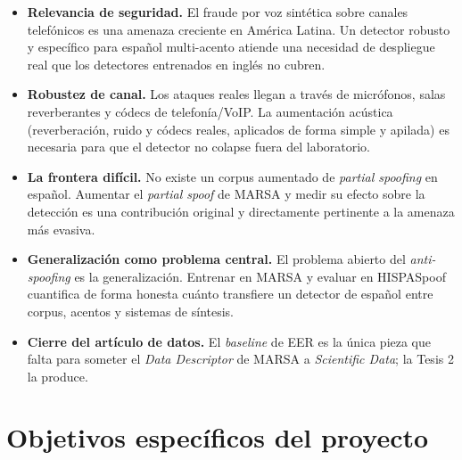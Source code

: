 \documentclass[11pt]{article}
\begin{document}
\begin{itemize}[leftmargin=1.2em]
  \item \textbf{Relevancia de seguridad.} El fraude por voz sint\'etica
  sobre canales telef\'onicos es una amenaza creciente en Am\'erica
  Latina. Un detector robusto y espec\'ifico para espa\~nol multi-acento
  atiende una necesidad de despliegue real que los detectores entrenados
  en ingl\'es no cubren.

  \item \textbf{Robustez de canal.} Los ataques reales llegan a trav\'es
  de micr\'ofonos, salas reverberantes y c\'odecs de telefon\'ia/VoIP. La
  aumentaci\'on ac\'ustica (reverberaci\'on, ruido y c\'odecs reales,
  aplicados de forma simple y apilada) es necesaria para que el detector
  no colapse fuera del laboratorio.

  \item \textbf{La frontera dif\'icil.} No existe un corpus aumentado de
  \emph{partial spoofing} en espa\~nol. Aumentar el \emph{partial spoof}
  de MARSA y medir su efecto sobre la detecci\'on es una contribuci\'on
  original y directamente pertinente a la amenaza m\'as evasiva.

  \item \textbf{Generalizaci\'on como problema central.} El problema
  abierto del \emph{anti-spoofing} es la generalizaci\'on. Entrenar en
  MARSA y evaluar en HISPASpoof cuantifica de forma honesta cu\'anto
  transfiere un detector de espa\~nol entre corpus, acentos y sistemas de
  s\'intesis.

  \item \textbf{Cierre del art\'iculo de datos.} El \emph{baseline} de EER
  es la \'unica pieza que falta para someter el \emph{Data Descriptor} de
  MARSA a \emph{Scientific Data}; la Tesis 2 la produce.
\end{itemize}

\section{Objetivos espec\'ificos del proyecto}
\end{document}
